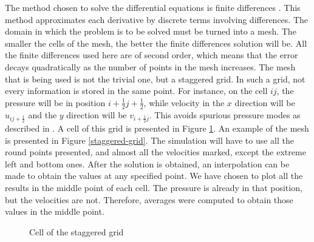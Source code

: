 \documentclass[journal]{IEEEtran}
\begin{document}
The method chosen to solve the differential equations is finite differences \cite{zbMATH03010997}. This method approximates each derivative by discrete terms involving differences. The domain in which the problem is to be solved must be turned into a mesh. The smaller the cells of the mesh, the better the finite differences solution will be. All the finite differences used here are of second order, which means that the error decays quadratically as the number of points in the mesh increases. The mesh that is being used is not the trivial one, but a staggered grid. In such a grid, not every information is stored in the same point. For instance, on the cell $ij$, the pressure will be in position $i+\frac{1}{2}j+\frac{1}{2}$, while velocity in the $x$ direction will be $u_{ij+\frac{1}{2}}$ and the $y$ direction will be $v_{i+\frac{1}{2}j}$. This avoids spurious pressure modes as described in \cite{hinchLectureNotes}. A cell of this grid is presented in Figure \ref{grid-cell}. An example of the mesh is presented in Figure \ref{staggered-grid}. The simulation will have to use all the round points presented, and almost all the velocities marked, except the extreme left and bottom ones. After the solution is obtained, an interpolation can be made to obtain the values at any specified point. We have chosen to plot all the results in the middle point of each cell. The pressure is already in that position, but the velocities are not. Therefore, averages were computed to obtain those values in the middle point.

\begin{figure}[!ht]
\centering
{}
\caption{Cell of the staggered grid\label{grid-cell}}
\end{figure}
\end{document}
